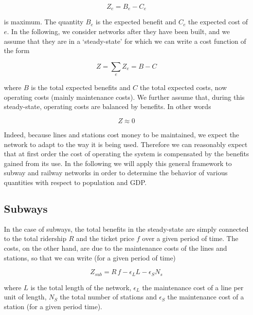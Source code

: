 \begin{equation} 
    Z_e = B_e - C_e 
\end{equation}

is maximum. The quantity $B_e$ is the expected benefit and $C_e$ the expected
cost of $e$. In the following, we consider networks after they have been built,
and we assume that they are in a `steady-state' for which we can write a cost
function of the form

\begin{equation} 
    Z =\sum_eZ_e= B - C 
\end{equation}

where $B$ is the total expected benefits and $C$ the total expected costs, now
operating costs (mainly maintenance costs). We further assume that, during this
steady-state, operating costs are balanced by benefits. In other words


\begin{equation} 
    Z \approx 0 
\end{equation} 

Indeed, because lines and stations cost money to be maintained, we expect the
network to adapt to the way it is being used. Therefore we can reasonably expect
that at first order the cost of operating the system is compensated by the
benefits gained from its use.  In the following we will apply this general
framework to subway and railway networks in order to determine the behavior of
various quantities with respect to population and GDP.

\subsection*{Subways}

In the case of subways, the total benefits in the steady-state are simply
connected to the total ridership $R$ and the ticket price $f$ over a given
period of time. The costs, on the other hand, are due to the maintenance costs
of the lines and stations, so that we can write (for a given period of time)

\begin{equation}
    Z_{sub} = R\,f - \epsilon_L L - \epsilon_S N_s
    \label{eq:cost-benefit}
\end{equation}

where $L$ is the total length of the network, $\epsilon_L$ the maintenance cost
of a line per unit of length, $N_S$ the total number of stations and
$\epsilon_S$ the maintenance cost of a station (for a given period time).

